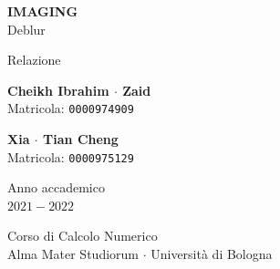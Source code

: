 \documentclass[11pt]{article}
\begin{document}
\graphicspath{ {./img/} }
\begin{titlepage}
    \begin{center}
        \vspace*{1.5cm}
            
        \Huge
        \textbf{IMAGING} \\
        \LARGE
        Deblur
            
        \vspace{0.5cm}
        \LARGE
        Relazione
            
        \vspace{1.5cm}
          
        \begin{minipage}[t]{0.47\textwidth}
        \begin{center}
        	{\large{\bf Cheikh Ibrahim $\cdot$ Zaid}}\\
			{\large Matricola: \texttt{0000974909}}
        \end{center}

		\end{minipage}
		\hfill
		\begin{minipage}[t]{0.47\textwidth}\raggedleft
		\begin{center}
        	{\large{\bf Xia $\cdot$ Tian Cheng}}\\
			{\large Matricola: \texttt{0000975129}}
        \end{center}
		\end{minipage}  
            
        \vspace{6cm}
            
        Anno accademico\\
        $2021 - 2022$
            
        \vspace{0.8cm}
            
            
        \Large
        Corso di Calcolo Numerico\\
        Alma Mater Studiorum $\cdot$ Università di Bologna\\
            
    \end{center}
\end{titlepage}
\pagebreak

\tableofcontents
\newpage
\end{document}
